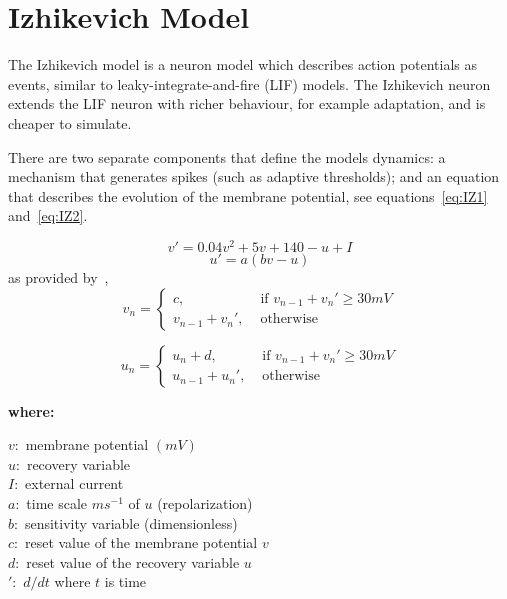 \documentclass[12pt]{scrreprt}
\begin{document}
\section{Izhikevich Model}
\label{sec:iz_model}
The Izhikevich model is a neuron model which describes action potentials as events, similar to leaky-integrate-and-fire (LIF) models. 
The Izhikevich neuron extends the LIF neuron with richer behaviour, for example adaptation, and is cheaper to simulate.

There are two separate components that define the models dynamics: a mechanism that generates spikes (such as adaptive thresholds); and an equation that describes the evolution of the membrane potential, see equations~\ref{eq:IZ1} and~\ref{eq:IZ2}.


\begin{equation} \label{eq:IZ1}
v'=0.04v^2+5v+140-u+I
\end{equation}
\begin{equation}\label{eq:IZ2}
u'=a(bv-u)
\end{equation}
as provided by~\cite{izhikevich2003simple}, \\

\begin{equation}\label{eq:IZ3}
v_n =
\begin{cases} 
c, & \text{ if } v_{n-1} + v_n' \geq 30mV \\
v_{n-1} + v_n', & \text{ otherwise}
\end{cases}
\end{equation}

\begin{equation}\label{eq:IZ4}
u_n =
\begin{cases} 
u_n + d, & \text{ if } v_{n-1} + v_n' \geq 30mV \\
u_{n-1} + u_n', & \text{ otherwise}
\end{cases}
\end{equation}

\noindent \textbf{where:}

\begin{multicols}{2}
\noindent$v :$ membrane potential $(mV)$ \\
$u :$ recovery variable \\
$I :$ external current \\
$a :$ time scale $ms^{-1}$ of $u$ (repolarization) \\
\vfill\null
\columnbreak
\noindent$b :$ sensitivity variable (dimensionless) \\
$c :$ reset value of the membrane potential $v$ \\
$d :$ reset value of the recovery variable $u$ \\
$' :$ $d/dt$ where $t$ is time \\
\end{multicols}
\end{document}
